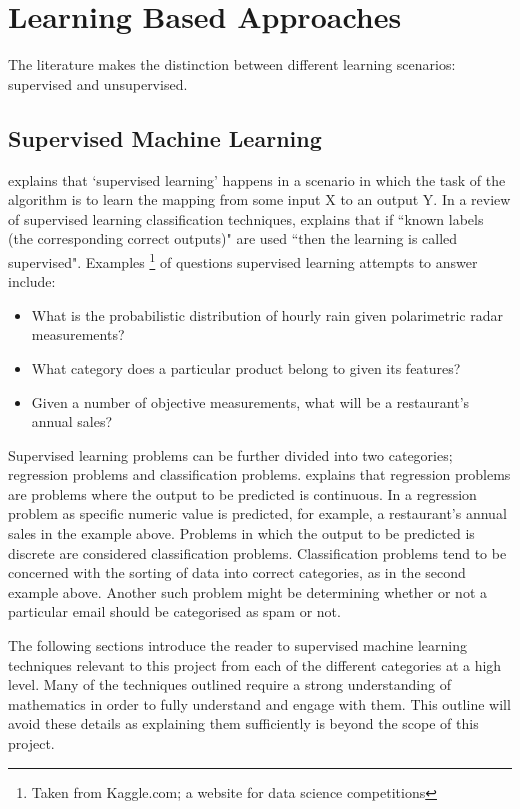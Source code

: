 \section{Learning Based Approaches}

The literature makes the distinction between different learning scenarios: supervised and unsupervised. 

\subsection{Supervised Machine Learning}
\cite{alpaydinintroduction} explains that `supervised learning' happens in a scenario in which the task of the algorithm is to learn the mapping from some input X to an output Y. In a review of supervised learning classification techniques, \cite{kotsiantis2007supervised} explains that if ``known labels (the corresponding correct outputs)" are used ``then the learning is called supervised". Examples \footnote{Taken from Kaggle.com; a website for data science competitions} of questions supervised learning attempts to answer include:

\begin{itemize}
  \item What is the probabilistic distribution of hourly rain given polarimetric radar measurements?
  \item What category does a particular product belong to given its features?
  \item Given a number of objective measurements, what will be a restaurant's annual sales? 
\end{itemize}

Supervised learning problems can be further divided into two categories; regression problems and classification problems. 
\cite{ng2000cs229} explains that regression problems are problems where the output to be predicted is continuous. In a regression problem as specific numeric value is predicted, for example, a restaurant's annual sales in the example above. Problems in which the output to be predicted is discrete are considered classification problems. Classification problems tend to be concerned with the sorting of data into correct categories, as in the second example above. Another such problem might be determining whether or not a particular email should be categorised as spam or not.  

The following sections introduce the reader to supervised machine learning techniques relevant to this project from each of the different categories at a high level. Many of the techniques outlined require a strong understanding of mathematics in order to fully understand and engage with them. This outline will avoid these details as explaining them sufficiently is beyond the scope of this project.

